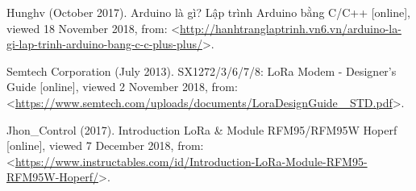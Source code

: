 \begin{thebibliography}{10}
Hunghv (October 2017). Arduino là gì? Lập trình Arduino bằng C/C++ [online], viewed 18 November 2018, from: <\href{http://hanhtranglaptrinh.vn6.vn/arduino-la-gi-lap-trinh-arduino-bang-c-c-plus-plus/}{http://hanhtranglaptrinh.vn6.vn/arduino-la-gi-lap-trinh-arduino-bang-c-c-plus-plus/}>.

Semtech Corporation (July 2013). SX1272/3/6/7/8: LoRa Modem - Designer’s Guide [online], viewed 2 November 2018, from: <\href{https://www.semtech.com/uploads/documents/LoraDesignGuide\_STD.pdf}{https://www.semtech.com/uploads/documents/LoraDesignGuide \_STD.pdf}>.

Jhon\_Control (2017). Introduction LoRa \& Module RFM95/RFM95W Hoperf [online], viewed 7 December 2018, from: <\href{https://www.instructables.com/id/Introduction-LoRa-Module-RFM95-RFM95W-Hoperf/}{https://www.instructables.com/id/Introduction-LoRa-Module-RFM95-RFM95W-Hoperf/}>.

\end{thebibliography}
